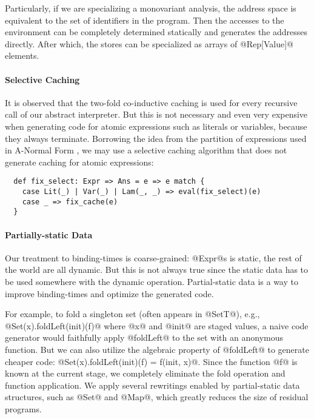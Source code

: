 Particularly, if we are specializing a monovariant analysis, the address space
is equivalent to the set of identifiers in the program. Then the accesses to the
environment can be completely determined statically and generates the addresses
directly. After which, the stores can be specialized as arrays of @Rep[Value]@
elements.

\paragraph{Selective Caching} It is observed that the two-fold co-inductive
caching is used for every recursive call of our abstract interpreter. But this
is not necessary and even very expensive when generating code for atomic
expressions such as literals or variables, because they always terminate.
Borrowing the idea from the partition of expressions used in A-Normal Form
\cite{Flanagan:1993:ECC:155090.155113}, we may use a selective caching
algorithm that does not generate caching for atomic expressions:

\begin{lstlisting}
  def fix_select: Expr => Ans = e => e match {
    case Lit(_) | Var(_) | Lam(_, _) => eval(fix_select)(e)
    case _ => fix_cache(e)
  }
\end{lstlisting}

\paragraph{Partially-static Data}

Our treatment to binding-times is coarse-grained: @Expr@s is static, the rest of
the world are all dynamic. But this is not always true since the static data
has to be used somewhere with the dynamic operation. Partial-static data is a
way to improve binding-times and optimize the generated code.

For example, to fold a singleton set (often appears in @SetT@), e.g.,
@Set(x).foldLeft(init)(f)@ where @x@ and @init@ are staged values, a naive code
generator would faithfully apply @foldLeft@ to the set with an anonymous
function. But we can also utilize the algebraic property of @foldLeft@ to
generate cheaper code: @Set(x).foldLeft(init)(f) = f(init, x)@. Since the
function @f@ is known at the current stage, we completely eliminate the fold
operation and function application. We apply several rewritings enabled by
partial-static data structures, such as @Set@ and @Map@, which greatly reduces
the size of residual programs.

